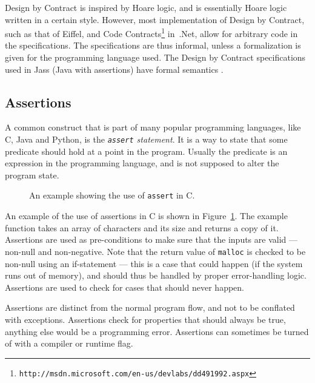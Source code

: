 Design by Contract is inspired by Hoare logic, and is essentially Hoare logic
written in a certain style. However, most implementation of Design by Contract,
such as that of Eiffel, and Code
Contracts\footnote{\texttt{http://msdn.microsoft.com/en-us/devlabs/dd491992.aspx}}
in~.Net, allow for arbitrary code in the specifications. The specifications are
thus informal, unless a formalization is given for the programming language
used. The Design by Contract specifications used in Jass (Java with assertions)
have formal semantics \cite{bartetzko01jass}.


\subsection{Assertions}

A common construct that is part of many popular programming languages, like C,
Java and Python, is the \textit{\texttt{assert} statement}. It is a way to
state that some predicate should hold at a point in the program. Usually the
predicate is an expression in the programming language, and is not supposed to
alter the program state.

\begin{figure}[h!]
	\begin{center}
	\begin{minipage}{0.7\textwidth}
    \lstset{language=C}
		
	\end{minipage}
	\end{center}
  \caption{An example showing the use of \texttt{assert} in C.}
	\label{figure-c-assert-example}
\end{figure}

An example of the use of assertions in C is shown in
Figure~\ref{figure-c-assert-example}. The example function takes an array of
characters and its size and returns a copy of it. Assertions are used as
pre-conditions to make sure that the inputs are valid --- non-null and
non-negative. Note that the return value of \texttt{malloc} is checked to be
non-null using an if-statement --- this is a case that could happen (if the
system runs out of memory), and should thus be handled by proper error-handling
logic. Assertions are used to check for cases that should never happen.

Assertions are distinct from the normal program flow, and not to be conflated
with exceptions. Assertions check for properties that should always be true,
anything else would be a programming error. Assertions can sometimes be turned
of with a compiler or runtime flag.

